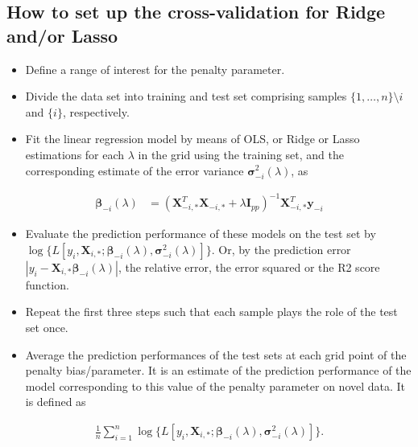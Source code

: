 \documentclass[%
oneside,                 %
final,                   %
10pt]{article}
\begin{document}
\subsection*{How to set up the cross-validation for Ridge and/or Lasso}

\begin{itemize}
\item Define a range of interest for the penalty parameter.

\item Divide the data set into training and test set comprising samples $\{1, \ldots, n\} \setminus i$ and $\{i \}$, respectively.

\item Fit the linear regression model by means of OLS, or Ridge or Lasso estimations  for each $\lambda$ in the grid using the training set, and the corresponding estimate of the error variance $\bm{\sigma}_{-i}^2(\lambda)$, as
\end{itemize}

\noindent
\begin{align*}
\bm{\beta}_{-i}(\lambda) & =  ( \bm{X}_{-i, \ast}^{T}
\bm{X}_{-i, \ast} + \lambda \bm{I}_{pp})^{-1}
\bm{X}_{-i, \ast}^{T} \bm{y}_{-i}
\end{align*}

\begin{itemize}
\item Evaluate the prediction performance of these models on the test set by $\log\{L[y_i, \bm{X}_{i, \ast}; \bm{\beta}_{-i}(\lambda), \bm{\sigma}_{-i}^2(\lambda)]\}$. Or, by the prediction error $|y_i - \bm{X}_{i, \ast} \bm{\beta}_{-i}(\lambda)|$, the relative error, the error squared or the R2 score function.

\item Repeat the first three steps  such that each sample plays the role of the test set once.

\item Average the prediction performances of the test sets at each grid point of the penalty bias/parameter. It is an estimate of the prediction performance of the model corresponding to this value of the penalty parameter on novel data. It is defined as
\end{itemize}

\noindent
\begin{align*}
\frac{1}{n} \sum_{i = 1}^n \log\{L[y_i, \mathbf{X}_{i, \ast}; \bm{\beta}_{-i}(\lambda), \bm{\sigma}_{-i}^2(\lambda)]\}.
\end{align*}
\end{document}
